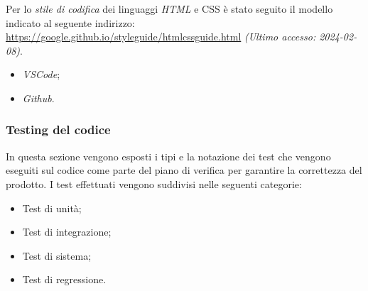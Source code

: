 \documentclass[10pt, a4paper]{article}
\begin{document}
Per lo \textit{stile di codifica\pg} dei linguaggi \textit{HTML\pg} e CSS è stato seguito il modello indicato al seguente
indirizzo: \url{https://google.github.io/styleguide/htmlcssguide.html} \textit{(Ultimo accesso: 2024-02-08)}.

\begin{itemize}
    \item \textit{VSCode};
    \item \textit{Github}.
\end{itemize}

\subsubsection{Testing del codice}
\label{sec:codeTesting}
In questa sezione vengono esposti i tipi e la notazione dei test che vengono eseguiti sul codice come parte del piano di verifica per garantire la correttezza del prodotto.
I test effettuati vengono suddivisi nelle seguenti categorie:
\begin{itemize}
    \item Test di unità;
    \item Test di integrazione;
    \item Test di sistema;
    \item Test di regressione.
\end{itemize}
\end{document}
